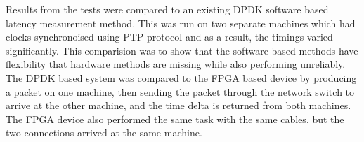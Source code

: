 \par Results from the tests were compared to an existing DPDK software based latency measurement method. This was 
run on two separate machines which had clocks synchronoised using PTP protocol and as a result, the timings varied 
significantly. This comparision was to show that the software based methods have flexibility that hardware methods
are missing while also performing unreliably. The DPDK based system was compared to the FPGA based device by producing
a packet on one machine, then sending the packet through the network switch to arrive at the other machine, and the
time delta is returned from both machines. The FPGA device also performed the same task with the same cables, but 
the two connections arrived at the same machine.
